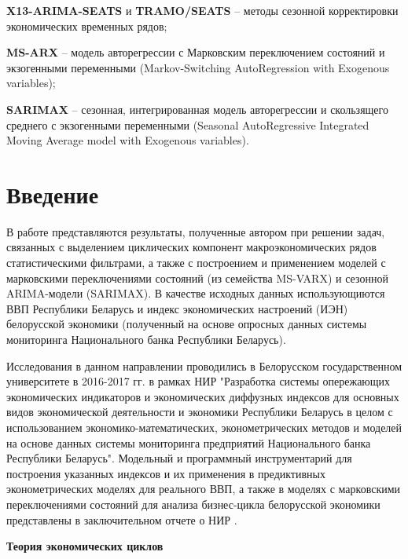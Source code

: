 \documentclass[a4paper,14pt]{extreport}
\begin{document}
	\textbf{X13-ARIMA-SEATS} и \textbf{TRAMO/SEATS} -- методы сезонной корректировки экономических временных рядов;
	
	\textbf{MS-ARX} -- модель авторегрессии с Марковским переключением состояний и экзогенными переменными (Markov-Switching AutoRegression with Exogenous variables);
	
	\textbf{SARIMAX} -- сезонная, интегрированная модель авторегрессии и скользящего среднего с экзогенными переменными (Seasonal AutoRegressive Integrated Moving Average model with Exogenous variables).
	
	\clearpage
	
	
	\chapter*{Введение}
	В работе представляются результаты, полученные автором при решении задач, связанных с выделением циклических компонент макроэкономических рядов статистическими фильтрами, а также с построением и применением моделей с марковскими переключениями состояний (из семейства MS-VARX) и сезонной ARIMA-модели (SARIMAX).	В качестве исходных данных использующиются ВВП Республики Беларусь и индекс экономических настроений (ИЭН) белорусской экономики (полученный на основе опросных данных системы мониторинга Национального банка Республики Беларусь). 
		
	Исследования в данном направлении проводились в Белорусском государственном университете в 2016-2017 гг. в рамках НИР "Разработка системы опережающих экономических индикаторов и экономических диффузных индексов для основных видов экономической деятельности и экономики Республики Беларусь в целом с использованием экономико-математических, эконометрических методов и моделей на основе данных системы мониторинга предприятий Национального банка Республики Беларусь". Модельный и программный инструментарий для построения указанных  индексов и их применения в предиктивных эконометрических моделях для реального ВВП, а также в моделях с марковскими переключениями состояний для анализа бизнес-цикла белорусской экономики представлены в заключительном отчете о НИР \cite{esiMaking}.
	
	\bigskip
	\textbf{Теория экономических циклов}
	
\end{document}
